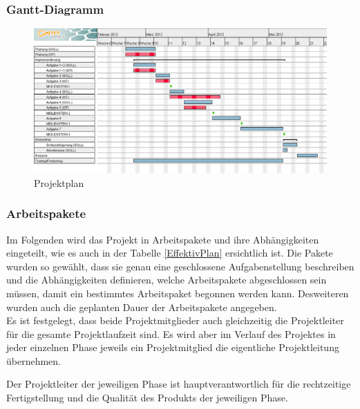 \documentclass[a4paper,10pt]{article}
\begin{document}
\subsubsection{Gantt-Diagramm}
\begin{figure}[h!]
\centering
\includegraphics[width=0.8\linewidth]{img/projektplanung.png}
\caption{Projektplan}
\label{prplan}
\end{figure}

\subsubsection{Arbeitspakete}
Im Folgenden wird das Projekt in Arbeitspakete und ihre Abhängigkeiten eingeteilt, wie es auch in der Tabelle \ref{EffektivPlan} ersichtlich ist. Die Pakete wurden so gewählt, dass sie genau eine geschlossene Aufgabenstellung beschreiben und die Abhängigkeiten definieren, welche Arbeitspakete abgeschlossen sein müssen, damit ein bestimmtes Arbeitspaket begonnen werden kann. Desweiteren wurden auch die geplanten Dauer der Arbeitspakete angegeben. \\

Es ist festgelegt, dass beide Projektmitglieder auch gleichzeitig die
Projektleiter für die gesamte Projektlaufzeit sind. Es wird aber im
Verlauf des Projektes in jeder einzelnen Phase jeweils ein
Projektmitglied die eigentliche Projektleitung übernehmen.

Der Projektleiter der jeweiligen Phase ist hauptverantwortlich für die
rechtzeitige Fertigstellung und die Qualität des Produkts der jeweiligen
Phase.
\end{document}
